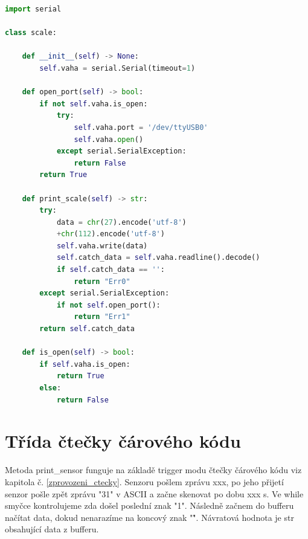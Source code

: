 \begin{lstlisting}[language=Python, caption=Hlavní okno, frame=single]
import serial

class scale:

    def __init__(self) -> None:
        self.vaha = serial.Serial(timeout=1)

    def open_port(self) -> bool:
        if not self.vaha.is_open:    
            try:
                self.vaha.port = '/dev/ttyUSB0'
                self.vaha.open()
            except serial.SerialException:
                return False
        return True

    def print_scale(self) -> str:
        try:
            data = chr(27).encode('utf-8')
            +chr(112).encode('utf-8')
            self.vaha.write(data)
            self.catch_data = self.vaha.readline().decode()
            if self.catch_data == '':
                return "Err0"
        except serial.SerialException:
            if not self.open_port():
                return "Err1"
        return self.catch_data
    
    def is_open(self) -> bool:
        if self.vaha.is_open:
            return True
        else:
            return False
\end{lstlisting}

\section{Třída čtečky čárového kódu}

Metoda print\_sensor funguje na základě trigger modu čtečky čárového kódu viz kapitola č. \ref{zprovozeni_ctecky}. Senzoru pošlem zprávu xxx, po jeho přijetí senzor pošle zpět zprávu "31" v ASCII a začne skenovat po dobu xxx s. Ve while smyčce kontrolujeme zda došel poslední znak "1". Následně začnem do bufferu načítat data, dokud nenarazíme na koncový znak "\r". Návratová hodnota je str obsahující data z bufferu.

